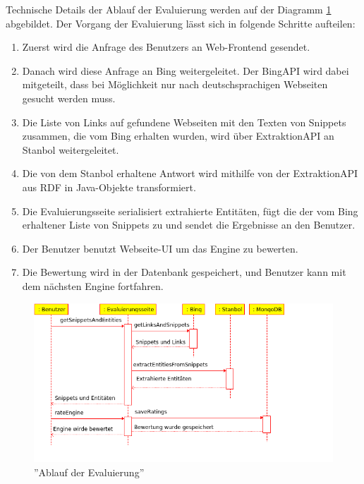 Technische Details der Ablauf der Evaluierung werden auf der Diagramm \ref{fig:eval-ablauf} abgebildet. Der Vorgang der Evaluierung lässt sich in folgende Schritte aufteilen:
\begin{enumerate}
\item Zuerst wird die Anfrage des Benutzers an Web-Frontend gesendet.
\item Danach wird diese Anfrage an Bing weitergeleitet. Der BingAPI wird dabei mitgeteilt, dass bei Möglichkeit nur nach deutschsprachigen Webseiten gesucht werden muss.
\item Die Liste von Links auf gefundene Webseiten mit den Texten von Snippets zusammen, die vom Bing erhalten wurden, wird über ExtraktionAPI an Stanbol weitergeleitet.
\item Die von dem Stanbol erhaltene Antwort wird mithilfe von der ExtraktionAPI aus RDF in Java-Objekte transformiert.
\item Die Evaluierungsseite serialisiert extrahierte Entitäten, fügt die der vom Bing erhaltener Liste von Snippets zu und sendet die Ergebnisse an den Benutzer.
\item Der Benutzer benutzt Webseite-UI um das Engine zu bewerten.
\item Die Bewertung wird in der Datenbank gespeichert, und Benutzer kann mit dem nächsten Engine fortfahren.
\end{enumerate}

\begin{figure}
\centering
\includegraphics[width=1\textwidth]{Bilder/eval_sequence.png}
\caption{''Ablauf der Evaluierung''}
\label{fig:eval-ablauf}
\end{figure}

